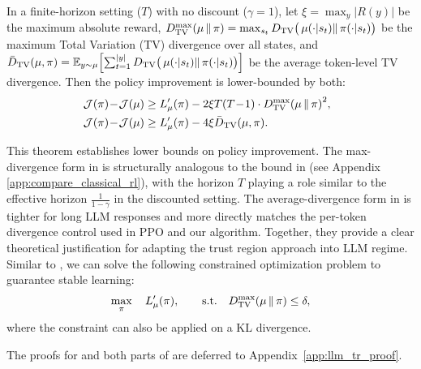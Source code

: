 \begin{theorem}  
\label{thm:llm_tr_bound}  
In a finite-horizon setting ($T$) with no discount ($\gamma=1$), let $\xi = \max_{y} |R(y)|$ be the maximum absolute reward, $D_{\mathrm{TV}}^{\max}(\operatorname*{{\textcolor{black}{\mu}}} \|  \operatorname*{{\textcolor{black}{\pi}}}) = \max_{s_t} D_{\mathrm{TV}}\big(\operatorname*{{\textcolor{black}{\mu}}}(\cdot|s_t)  \|  \operatorname*{{\textcolor{black}{\pi}}}(\cdot|s_t)\big)$ be the maximum Total Variation (TV) divergence over all states, and
\(
\bar{D}_{\mathrm{TV}}(\operatorname*{{\textcolor{black}{\mu}}},\operatorname*{{\textcolor{black}{\pi}}})
= \mathbb{E}_{y \sim \operatorname*{{\textcolor{black}{\mu}}}}\!\left[\sum_{t=1}^{|y|} D_{\mathrm{TV}}\big(\operatorname*{{\textcolor{black}{\mu}}}(\cdot|s_t)\|\operatorname*{{\textcolor{black}{\pi}}}(\cdot|s_t)\big)\right]
\)
be the average token-level TV divergence. Then the policy improvement is lower-bounded by both:
\begin{align}
\!\!\!\!  \mathcal{J}(\trainerpi) \!-\! \mathcal{J}(\rolloutpi)
&\ge L_{\rolloutpi}'(\trainerpi) - 2 \xi T(T\!-\!1) \cdot {D_{\mathrm{TV}}^{\max}(\rolloutpi \| \trainerpi)}^2,
\label{eq:llm-tv-bound} \\
\!\!\!\!  \mathcal{J}(\trainerpi) \!-\! \mathcal{J}(\rolloutpi)
&\ge L_{\rolloutpi}'(\trainerpi) - 4 \xi \bar{D}_{\mathrm{TV}}(\rolloutpi,\trainerpi).
\label{eq:llm-tv-linear-bound}
\end{align}
\end{theorem}  
This theorem establishes lower bounds on policy improvement. The max-divergence form in  is structurally analogous to the bound in  (see Appendix \ref{app:compare_classical_rl}), with the horizon $T$ playing a role similar to the effective horizon $\frac{1}{1-\gamma}$ in the discounted setting. The average-divergence form in  is tighter for long LLM responses and more directly matches the per-token divergence control used in PPO and our algorithm. Together, they provide a clear theoretical justification for adapting the trust region approach into LLM regime.
Similar to , we can solve the following constrained optimization problem to guarantee stable learning:
\begin{equation}
\label{eq:llm-trpo-obj} 
\max_{\operatorname*{{\textcolor{black}{\pi}}}} \quad  L_{\operatorname*{{\textcolor{black}{\mu}}}}'(\operatorname*{{\textcolor{black}{\pi}}}), \quad \quad
\text{s.t.} \quad  D_{\mathrm{TV}}^{\max}(\operatorname*{{\textcolor{black}{\mu}}} \| \operatorname*{{\textcolor{black}{\pi}}}) \le \delta,  
\end{equation}   
where the constraint can also be applied on a KL divergence.

The proofs for  and both parts of  are deferred to Appendix~\ref{app:llm_tr_proof}.
